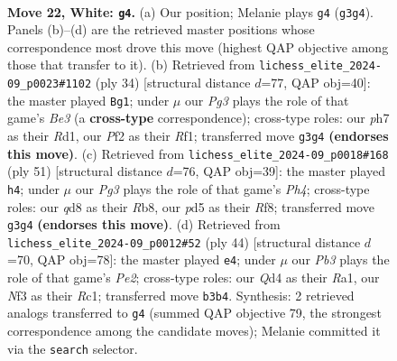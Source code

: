 \documentclass[11pt]{article}
\begin{document}
\begin{figure}[p]
\label{fig:thought-m40}
\end{figure}

\clearpage

\begin{figure}[p]\centering
\begin{subfigure}{0.46\textwidth}\centering
\resizebox{\linewidth}{!}{%
\newchessgame
\chessboard[
  setfen={rr1qb1k1/p4ppp/B7/p2p3n/3Q3P/1P3NP1/P4P2/R3R1K1 w - - 4 22},
  showmover=false,
  pgfstyle=straightmove, color=movearrow, markmove={g3-g4}
]}
\caption{}
\end{subfigure}\hfill
\begin{subfigure}{0.46\textwidth}\centering
\resizebox{\linewidth}{!}{%
\newchessgame
\chessboard[
  setfen={r4rk1/pppqb1pp/3pp3/8/P1Q1PPn1/2N1B3/1PP3PP/3R1R1K w - - 6 18},
  showmover=false,
  pgfstyle=straightmove, color=movearrow, markmove={e3-g1}
]}
\caption{}
\end{subfigure}
\\[4pt]
\begin{subfigure}{0.46\textwidth}\centering
\resizebox{\linewidth}{!}{%
\newchessgame
\chessboard[
  setfen={1r3rk1/1p3p2/2p1n1p1/P5qp/1QP5/8/PR2BPPP/1R4K1 b - - 0 26},
  showmover=false,
  pgfstyle=straightmove, color=movearrow, markmove={h5-h4}
]}
\caption{}
\end{subfigure}\hfill
\begin{subfigure}{0.46\textwidth}\centering
\resizebox{\linewidth}{!}{%
\newchessgame
\chessboard[
  setfen={r1r3k1/1q3ppp/4p3/p4n2/2pP4/2Q2PP1/1PN1P2P/R1R3K1 w - - 3 23},
  showmover=false,
  pgfstyle=straightmove, color=movearrow, markmove={e2-e4}
]}
\caption{}
\end{subfigure}
\caption{\textbf{Move 22, White: \texttt{g4}.} (a) Our position; Melanie plays \texttt{g4} (\texttt{g3g4}). Panels (b)--(d) are the retrieved master positions whose correspondence most drove this move (highest QAP objective among those that transfer to it). (b) Retrieved from \texttt{lichess\_elite\_2024-09\_p0023\#1102} (ply 34) [structural distance $d$=77, QAP obj=40]: the master played \texttt{Bg1}; under $\mu$ our \emph{Pg3} plays the role of that game's \emph{Be3} (a \textbf{cross-type} correspondence); cross-type roles: our \emph{p}h7 as their \emph{R}d1, our \emph{P}f2 as their \emph{R}f1; transferred move \texttt{g3g4} \textbf{(endorses this move)}. (c) Retrieved from \texttt{lichess\_elite\_2024-09\_p0018\#168} (ply 51) [structural distance $d$=76, QAP obj=39]: the master played \texttt{h4}; under $\mu$ our \emph{Pg3} plays the role of that game's \emph{Ph4}; cross-type roles: our \emph{q}d8 as their \emph{R}b8, our \emph{p}d5 as their \emph{R}f8; transferred move \texttt{g3g4} \textbf{(endorses this move)}. (d) Retrieved from \texttt{lichess\_elite\_2024-09\_p0012\#52} (ply 44) [structural distance $d$=70, QAP obj=78]: the master played \texttt{e4}; under $\mu$ our \emph{Pb3} plays the role of that game's \emph{Pe2}; cross-type roles: our \emph{Q}d4 as their \emph{R}a1, our \emph{N}f3 as their \emph{R}c1; transferred move \texttt{b3b4}. Synthesis: 2 retrieved analogs transferred to \texttt{g4} (summed QAP objective 79, the strongest correspondence among the candidate moves); Melanie committed it via the \texttt{search} selector.}

\end{figure}
\end{document}
